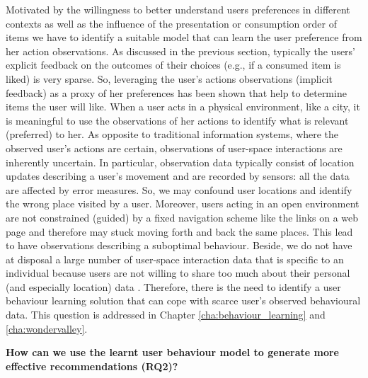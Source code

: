	Motivated by the willingness to better understand users preferences in different contexts as well as the influence of the presentation or consumption order of items we have to identify a suitable model that can learn the user preference from her action observations. As discussed in the previous section, typically the users' explicit feedback on the outcomes of their choices (e.g., if a consumed item is liked) is very sparse. So, leveraging the user's actions observations (implicit feedback) as a proxy of her preferences has been shown that help to determine items the user will like. When a user acts in a physical environment, like a city, it is meaningful to use the observations of her actions to identify what is relevant (preferred) to her. As opposite to traditional information systems, where the observed user's actions are certain,%
	observations of user-space interactions %
	are inherently uncertain. 
	In particular, observation data typically consist of location updates describing a user's movement and are recorded by sensors: all the data are affected by error measures. So, we may confound user locations and identify the wrong place visited by a user. Moreover, users acting in an open environment are not constrained (guided) by a fixed navigation scheme like the links on a web page and therefore may stuck moving forth and back the same places. This lead to have observations describing a suboptimal behaviour. Beside, we do not have at disposal a large number of user-space interaction data that is specific to an individual because users are not willing to share too much about their personal (and especially location) data \cite{location_privacy:Poikela2014}.
	Therefore, there is the need to identify a user behaviour learning solution that can cope with scarce user's observed behavioural data. %
	This question is addressed in Chapter \ref{cha:behaviour_learning} and \ref{cha:wondervalley}. \newline
	
	\noindent\textbf{How can we use the learnt user behaviour model to generate more effective recommendations (RQ2)?}
	
